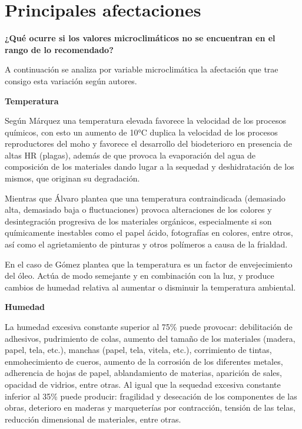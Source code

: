     \section{Principales afectaciones}\label{sec:principales_afectaciones}

    \textbf{¿Qué ocurre si los valores microclimáticos no se encuentran en el rango de lo recomendado?}

    A continuación se analiza por variable microclimática la afectación que trae consigo esta variación según autores.

    \textbf{Temperatura}

    Según Márquez \cite{marquezAgentesDeterioroMedioambientales2016} una temperatura elevada favorece la velocidad de los procesos químicos, con esto un aumento de 10°C duplica la velocidad de los procesos reproductores del moho y favorece  el desarrollo del biodeterioro en presencia de altas HR (plagas), además de que provoca la evaporación del agua de composición de los materiales dando lugar a la sequedad y deshidratación de los mismos, que originan su degradación.

    Mientras que Álvaro \cite{recioalvaroConservacionPreventivaExposiciones2020} plantea que una temperatura contraindicada (demasiado alta, demasiado baja o fluctuaciones) provoca alteraciones de los colores y desintegración progresiva de los materiales orgánicos, especialmente si son químicamente inestables como el papel ácido, fotografías en colores, entre otros, así como el agrietamiento de pinturas y otros polímeros a causa de la frialdad.

    En el caso de Gómez \cite{gomezcarreteroEfectosAcidoNitrico2015a} plantea que la temperatura es un factor de envejecimiento del óleo. Actúa de modo semejante y en combinación con la luz, y produce cambios de humedad relativa al aumentar o disminuir la temperatura ambiental.

    \textbf{Humedad}

    La humedad excesiva constante superior al 75\% puede provocar: debilitación de adhesivos, pudrimiento de colas, aumento del tamaño de los materiales (madera, papel, tela, etc.), manchas (papel, tela, vitela, etc.), corrimiento de tintas, enmohecimiento de cueros, aumento de la corrosión de los diferentes metales, adherencia de hojas de papel, ablandamiento de materias, aparición de sales, opacidad de vidrios, entre otras. Al igual que la sequedad excesiva constante inferior al 35\% puede producir: fragilidad y desecación de los componentes de las obras, deterioro en maderas y marqueterías por contracción, tensión de las telas, reducción dimensional de materiales, entre otras.\cite{marquezAgentesDeterioroMedioambientales2016}

